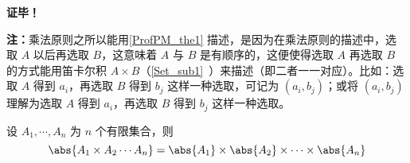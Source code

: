 \textbf{证毕！}

\textbf{注：}乘法原则之所以能用\autoref{ProfPM_the1} 描述，是因为在乘法原则的描述中，选取 $A$ 以后再选取 $B$，这意味着 $A$ 与 $B$ 是有顺序的，这便使得选取 $A$ 再选取 $B$ 的方式能用笛卡尔积 $A\times B$（\autoref{Set_sub1}~）来描述（即二者一一对应）。比如：选取 $A$ 得到 $a_i$，再选取 $B$ 得到 $b_j$ 这样一种选取，可记为 $(a_i,b_j)$；或将 $(a_i,b_j)$ 理解为选取 $A$ 得到 $a_i$，再选取 $B$ 得到 $b_j$ 这样一种选取。
\begin{corollary}{}
设 $A_1,\cdots,A_n$ 为 $n$ 个有限集合，则
\begin{equation}
\abs{A_1\times A_2\cdots A_n}=\abs{A_1}\times\abs{A_2}\times\cdots\times\abs{A_n}
\end{equation}

\end{corollary}